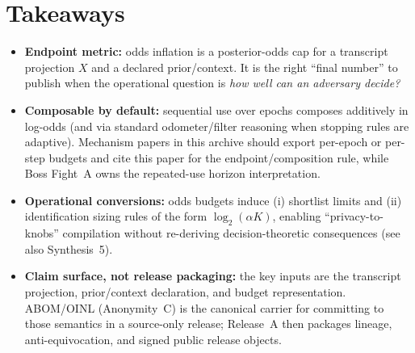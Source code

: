 \documentclass[11pt]{article}
\theoremstyle{definition}
\theoremstyle{remark}
\begin{document}
\section{Takeaways}
\begin{itemize}[leftmargin=*]
\item \textbf{Endpoint metric:} odds inflation is a posterior-odds cap for a transcript projection $X$ and a declared prior/context. It is the right ``final number'' to publish when the operational question is \emph{how well can an adversary decide?}
\item \textbf{Composable by default:} sequential use over epochs composes additively in log-odds (and via standard odometer/filter reasoning when stopping rules are adaptive). Mechanism papers in this archive should export per-epoch or per-step budgets and cite this paper for the endpoint/composition rule, while Boss Fight~A owns the repeated-use horizon interpretation.\cite{series:bossfightA}
\item \textbf{Operational conversions:} odds budgets induce (i) shortlist limits and (ii) identification sizing rules of the form $\log_2(\alpha K)$, enabling ``privacy-to-knobs'' compilation without re-deriving decision-theoretic consequences (see also Synthesis~5).\cite{series:endpointbridge}
\item \textbf{Claim surface, not release packaging:} the key inputs are the transcript projection, prior/context declaration, and budget representation. ABOM/OINL (Anonymity~C) is the canonical carrier for committing to those semantics in a source-only release; Release~A then packages lineage, anti-equivocation, and signed public release objects.\cite{series:abomoinl,series:releaseA}
\end{itemize}
\end{document}
